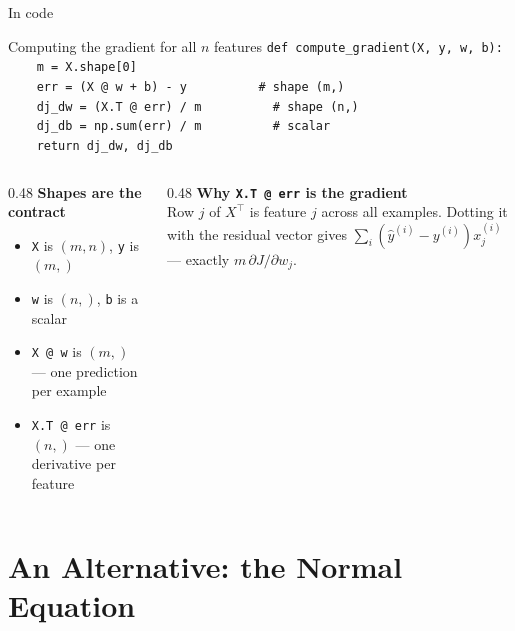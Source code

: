 \documentclass[aspectratio=169,10pt]{beamer}
\begin{document}
\begin{frame}{In code}
  \footnotesize
  \begin{block}{Computing the gradient for all $n$ features}
    \texttt{def compute\_gradient(X, y, w, b):}\\
    \texttt{\ \ \ \ m = X.shape[0]}\\
    \texttt{\ \ \ \ err   = (X @ w + b) - y\ \ \ \ \ \ \ \ \ \ \# shape (m,)}\\
    \texttt{\ \ \ \ dj\_dw = (X.T @ err) / m\ \ \ \ \ \ \ \ \ \ \# shape (n,)}\\
    \texttt{\ \ \ \ dj\_db = np.sum(err) / m\ \ \ \ \ \ \ \ \ \ \# scalar}\\
    \texttt{\ \ \ \ return dj\_dw, dj\_db}
  \end{block}
  \begin{columns}[T,onlytextwidth]
    \begin{column}{0.48\textwidth}
      \textbf{Shapes are the contract}
      \begin{itemize}
        \item \texttt{X} is $(m,n)$, \texttt{y} is $(m,)$
        \item \texttt{w} is $(n,)$, \texttt{b} is a scalar
        \item \texttt{X @ w} is $(m,)$ --- one prediction per example
        \item \texttt{X.T @ err} is $(n,)$ --- one derivative per feature
      \end{itemize}
    \end{column}
    \begin{column}{0.48\textwidth}
      \textbf{Why \texttt{X.T @ err} is the gradient}\\[2pt]
      Row $j$ of $X^{\!\top}$ is feature $j$ across all examples. Dotting it with the residual
      vector gives $\sum_i(\hat y^{(i)}-y^{(i)})x^{(i)}_j$ --- exactly
      $m\,\partial J/\partial w_j$.
    \end{column}
  \end{columns}
\end{frame}

\section{An Alternative: the Normal Equation}
\end{document}
